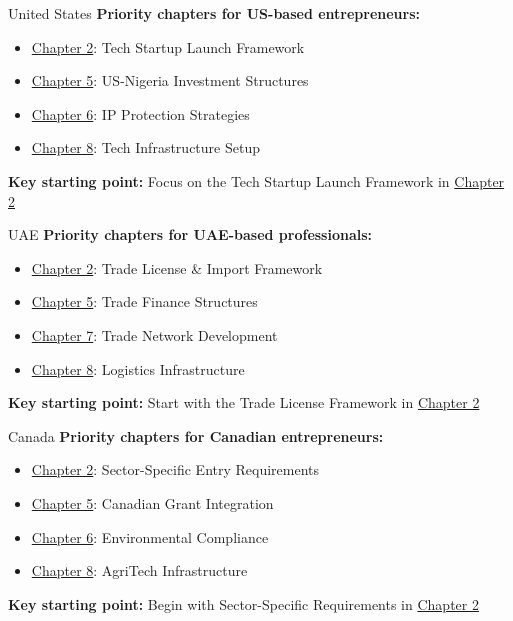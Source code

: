 \begin{regionalbox}{United States}
\textbf{Priority chapters for US-based entrepreneurs:}
\begin{itemize}
    \item \hyperref[ch:building-your-entry-strategy]{Chapter 2}: Tech Startup Launch Framework
    \item \hyperref[ch:financial-planning]{Chapter 5}: US-Nigeria Investment Structures
    \item \hyperref[ch:risk-management-and-compliance]{Chapter 6}: IP Protection Strategies
    \item \hyperref[ch:technology-operations]{Chapter 8}: Tech Infrastructure Setup
\end{itemize}

\textbf{Key starting point:} Focus on the Tech Startup Launch Framework in \hyperref[ch:building-your-entry-strategy]{Chapter 2}
\end{regionalbox}

\begin{regionalbox}{UAE}
\textbf{Priority chapters for UAE-based professionals:}
\begin{itemize}
    \item \hyperref[ch:building-your-entry-strategy]{Chapter 2}: Trade License \& Import Framework
    \item \hyperref[ch:financial-planning]{Chapter 5}: Trade Finance Structures
    \item \hyperref[ch:local-network]{Chapter 7}: Trade Network Development
    \item \hyperref[ch:technology-operations]{Chapter 8}: Logistics Infrastructure
\end{itemize}

\textbf{Key starting point:} Start with the Trade License Framework in \hyperref[ch:building-your-entry-strategy]{Chapter 2}
\end{regionalbox}

\begin{regionalbox}{Canada}
\textbf{Priority chapters for Canadian entrepreneurs:}
\begin{itemize}
    \item \hyperref[ch:building-your-entry-strategy]{Chapter 2}: Sector-Specific Entry Requirements
    \item \hyperref[ch:financial-planning]{Chapter 5}: Canadian Grant Integration
    \item \hyperref[ch:risk-management-and-compliance]{Chapter 6}: Environmental Compliance
    \item \hyperref[ch:technology-operations]{Chapter 8}: AgriTech Infrastructure
\end{itemize}

\textbf{Key starting point:} Begin with Sector-Specific Requirements in \hyperref[ch:building-your-entry-strategy]{Chapter 2}
\end{regionalbox}


